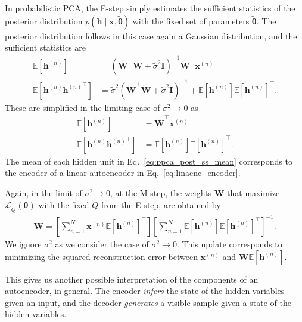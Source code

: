 \documentclass[dissertation,nocontribution]{aaltoseries}
\newcommand{\vect}[1]{\mathbf{#1}}
\newcommand{\vects}[1]{\boldsymbol{#1}}
\newcommand{\matr}[1]{\mathbf{#1}}
\newcommand{\vh}[0]{\vect{h}}
\newcommand{\vx}[0]{\vect{x}}
\newcommand{\mW}[0]{\matr{W}}
\newcommand{\mI}{\matr{I}}
\newcommand{\TT}[0]{{\vects{\theta}}}
\newcommand{\LL}[0]{\mathcal{L}}
\newcommand{\E}[0]{\mathbb{E}}
\begin{document}
In probabilistic PCA, the E-step simply estimates the
sufficient statistics of the posterior distribution $p(\vh
\mid \vx, \tilde{\TT})$ with the fixed set of parameters
$\tilde{\TT}$.
The posterior distribution follows in this case again a
Gaussian distribution, and the sufficient statistics are
\begin{align*}
    \E \left[ \vh^{(n)} \right] &= (\tilde{\mW}^\top
    \tilde{\mW} + \tilde{\sigma}^2
    \mI)^{-1} \tilde{\mW}^\top \vx^{(n)} \\
    \E \left[ \vh^{(n)} {\vh^{(n)}}^\top \right] &=
    \tilde{\sigma}^2 (\tilde{\mW}^\top \tilde{\mW} +
    \tilde{\sigma}^2
    \mI)^{-1} + \E\left[\vh^{(n)}\right] \E\left[ \vh^{(n)}
    \right]^\top.
\end{align*}
These are simplified in the limiting case of $\sigma^2 \to
0$ as
\begin{align}
    \label{eq:ppca_post_ss_mean}
    \E \left[ \vh^{(n)} \right] &= \tilde{\mW}^\top \vx^{(n)} \\
    \label{eq:ppca_post_ss_cov}
    \E \left[ \vh^{(n)} {\vh^{(n)}}^\top \right] &=
    \E\left[\vh^{(n)}\right] \E\left[ \vh^{(n)}
    \right]^\top.
\end{align}
The mean of each hidden unit in
Eq.~\eqref{eq:ppca_post_ss_mean} 
corresponds to the
encoder of a linear autoencoder in
Eq.~\eqref{eq:linaenc_encoder}.

Again, in the limit of $\sigma^2 \to 0$, at the M-step, the
weights $\mW$ that maximize $\LL_{\tilde{Q}}(\TT)$ with the fixed
$\tilde{Q}$ from the E-step, are obtained by
\begin{align}
    \label{eq:ppca_m_weights}
    \mW = \left[ \sum_{n=1}^N \vx^{(n)} \E\left[ \vh^{(n)}
    \right]^\top \right]\left[ \sum_{n=1}^N \E\left[
    \vh^{(n)} \right] \E\left[ \vh^{(n)} \right]^\top
    \right]^{-1}.
\end{align}
We ignore $\sigma^2$ as we consider the case of $\sigma^2 \to
0$.  This update corresponds to minimizing the squared
reconstruction error between $\vx^{(n)}$ and $\mW
\E\left[\vh^{(n)}\right]$.


This gives us another possible interpretation of the
components of an autoencoder, in general. The encoder
\textit{infers} the state of the hidden variables given an
input, and the decoder \textit{generates} a visible sample
given a state of the hidden variables.
\end{document}
